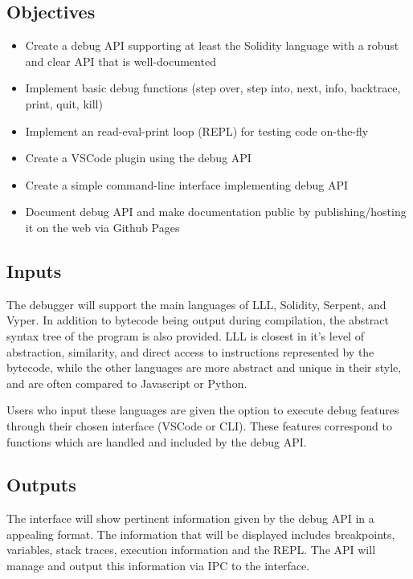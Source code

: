 \documentclass[]{article}
\begin{document}
\subsection{Objectives}
\begin{itemize}
	\item Create a debug API supporting at least the Solidity language with a robust and clear API that is well-documented
	\item Implement basic debug functions (step over, step into, next, info, backtrace, print, quit, kill)
	\item Implement an read-eval-print loop (REPL) for testing code on-the-fly
	\item Create a VSCode plugin using the debug API
	\item Create a simple command-line interface implementing debug API
	\item Document debug API and make documentation public by publishing/hosting it on the web via Github Pages
\end{itemize}

\subsection{Inputs}
The debugger will support the main languages of LLL, Solidity, Serpent, and Vyper. In addition to bytecode being output during compilation, the abstract syntax tree of the program is also provided. LLL is closest in it's level of abstraction, similarity, and direct access to instructions represented by the bytecode, while the other languages are more abstract and unique in their style, and are often compared to Javascript or Python.

Users who input these languages are given the option to execute debug features through their chosen interface (VSCode or CLI). These features correspond to functions which are handled and included by the debug API.

\subsection{Outputs}
The interface will show pertinent information given by the debug API in a appealing format. The information that will be displayed includes breakpoints, variables, stack traces, execution information and the REPL. The API will manage and output this information via IPC to the interface.
\end{document}
